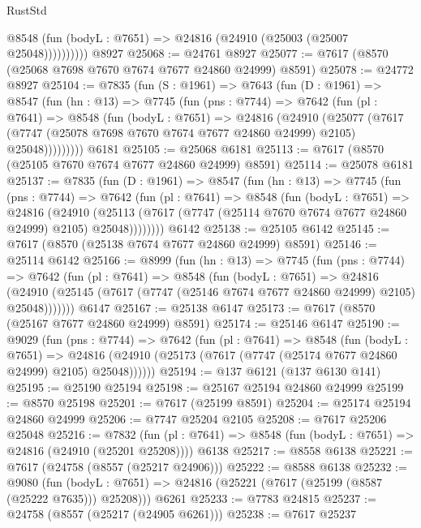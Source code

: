 \begin{lexlean}{RustStd}
\begin{coremodule}
              @8548 (fun (bodyL : @7651) => @24816 (@24910 (@25003 (@25007 @25048))))))))))
    @8927
@25068 := @24761 @8927
@25077 := @7617 (@8570 (@25068 @7698 @7670 @7674 @7677 @24860 @24999) @8591)
@25078 := @24772 @8927
@25104 := @7835
    (fun (S : @1961) =>
    @7643
      (fun (D : @1961) =>
      @8547
        (fun (hn : @13) =>
        @7745
          (fun (pns : @7744) =>
          @7642
            (fun (pl : @7641) =>
            @8548
              (fun (bodyL : @7651) =>
              @24816
                (@24910
                  (@25077
                    (@7617
                      (@7747 (@25078 @7698 @7670 @7674 @7677 @24860 @24999) @2105)
                      @25048)))))))))
    @6181
@25105 := @25068 @6181
@25113 := @7617 (@8570 (@25105 @7670 @7674 @7677 @24860 @24999) @8591)
@25114 := @25078 @6181
@25137 := @7835
    (fun (D : @1961) =>
    @8547
      (fun (hn : @13) =>
      @7745
        (fun (pns : @7744) =>
        @7642
          (fun (pl : @7641) =>
          @8548
            (fun (bodyL : @7651) =>
            @24816
              (@24910
                (@25113 (@7617 (@7747 (@25114 @7670 @7674 @7677 @24860 @24999) @2105) @25048))))))))
    @6142
@25138 := @25105 @6142
@25145 := @7617 (@8570 (@25138 @7674 @7677 @24860 @24999) @8591)
@25146 := @25114 @6142
@25166 := @8999
    (fun (hn : @13) =>
    @7745
      (fun (pns : @7744) =>
      @7642
        (fun (pl : @7641) =>
        @8548
          (fun (bodyL : @7651) =>
          @24816
            (@24910 (@25145 (@7617 (@7747 (@25146 @7674 @7677 @24860 @24999) @2105) @25048)))))))
    @6147
@25167 := @25138 @6147
@25173 := @7617 (@8570 (@25167 @7677 @24860 @24999) @8591)
@25174 := @25146 @6147
@25190 := @9029
    (fun (pns : @7744) =>
    @7642
      (fun (pl : @7641) =>
      @8548
        (fun (bodyL : @7651) =>
        @24816 (@24910 (@25173 (@7617 (@7747 (@25174 @7677 @24860 @24999) @2105) @25048))))))
@25194 := @137 @6121 (@137 @6130 @141)
@25195 := @25190 @25194
@25198 := @25167 @25194 @24860 @24999
@25199 := @8570 @25198
@25201 := @7617 (@25199 @8591)
@25204 := @25174 @25194 @24860 @24999
@25206 := @7747 @25204 @2105
@25208 := @7617 @25206 @25048
@25216 := @7832
    (fun (pl : @7641) => @8548 (fun (bodyL : @7651) => @24816 (@24910 (@25201 @25208))))
    @6138
@25217 := @8558 @6138
@25221 := @7617 (@24758 (@8557 (@25217 @24906)))
@25222 := @8588 @6138
@25232 := @9080
    (fun (bodyL : @7651) => @24816 (@25221 (@7617 (@25199 (@8587 (@25222 @7635))) @25208)))
    @6261
@25233 := @7783 @24815
@25237 := @24758 (@8557 (@25217 (@24905 @6261)))
@25238 := @7617 @25237

\end{coremodule}
\end{lexlean}
